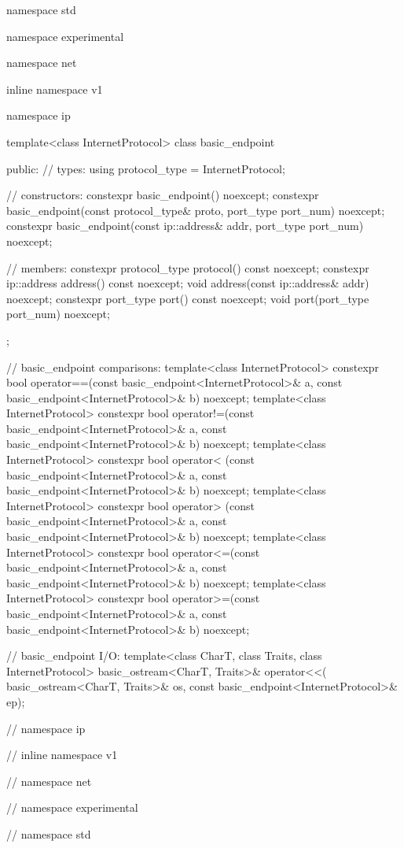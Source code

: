\begin{codeblock}
namespace std {
namespace experimental {
namespace net {
inline namespace v1 {
namespace ip {

  template<class InternetProtocol>
  class basic_endpoint
  {
  public:
    // types:
    using protocol_type = InternetProtocol;

    // constructors:
    constexpr basic_endpoint() noexcept;
    constexpr basic_endpoint(const protocol_type& proto,
                             port_type port_num) noexcept;
    constexpr basic_endpoint(const ip::address& addr,
                             port_type port_num) noexcept;

    // members:
    constexpr protocol_type protocol() const noexcept;
    constexpr ip::address address() const noexcept;
    void address(const ip::address& addr) noexcept;
    constexpr port_type port() const noexcept;
    void port(port_type port_num) noexcept;
  };

  // basic_endpoint comparisons:
  template<class InternetProtocol>
    constexpr bool operator==(const basic_endpoint<InternetProtocol>& a,
                              const basic_endpoint<InternetProtocol>& b) noexcept;
  template<class InternetProtocol>
    constexpr bool operator!=(const basic_endpoint<InternetProtocol>& a,
                              const basic_endpoint<InternetProtocol>& b) noexcept;
  template<class InternetProtocol>
    constexpr bool operator< (const basic_endpoint<InternetProtocol>& a,
                              const basic_endpoint<InternetProtocol>& b) noexcept;
  template<class InternetProtocol>
    constexpr bool operator> (const basic_endpoint<InternetProtocol>& a,
                              const basic_endpoint<InternetProtocol>& b) noexcept;
  template<class InternetProtocol>
    constexpr bool operator<=(const basic_endpoint<InternetProtocol>& a,
                              const basic_endpoint<InternetProtocol>& b) noexcept;
  template<class InternetProtocol>
    constexpr bool operator>=(const basic_endpoint<InternetProtocol>& a,
                              const basic_endpoint<InternetProtocol>& b) noexcept;

  // basic_endpoint I/O:
  template<class CharT, class Traits, class InternetProtocol>
    basic_ostream<CharT, Traits>& operator<<(
      basic_ostream<CharT, Traits>& os,
      const basic_endpoint<InternetProtocol>& ep);

} // namespace ip
} // inline namespace v1
} // namespace net
} // namespace experimental
} // namespace std
\end{codeblock}

